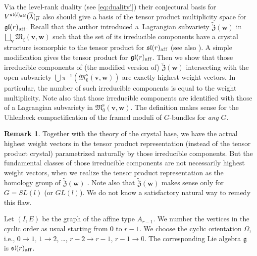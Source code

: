 \documentclass[pdftex]{sigma}
\theoremstyle{definition}
\newtheorem{Remark}[equation]{Remark}
\numberwithin{equation}{section}
\newcommand{\algsl}{\operatorname{\mathfrak{sl}}} %
\newcommand{\gl}{\operatorname{\mathfrak{gl}}}
\newcommand{\g}{{\mathfrak g}}
\newcommand{\M}{{\mathfrak M}} %
\newcommand{\Mreg}{\M^{\operatorname{s}}}
\newcommand{\bv}{{\mathbf v}} %
\newcommand{\bw}{{\mathbf w}} %
\newcommand{\aff}{\mathrm{af\/f}}
\begin{document}
Via the level-rank duality (see \eqref{eq:duality'}) their conjectural
basis for $V^{\algsl(l)_\aff}(\overline{\lambda})_{\overline{\mu}}$
also should give a basis of the tensor product multiplicity space for
$\gl(r)_\aff$.
%
Recall that the author introduced a~Lagrangian subvariety
$\widetilde{\mathfrak Z}(\bw)$ in $\bigsqcup_{\bv} \M_\zeta(\bv,\bw)$
such that the set of its irreducible components have a crystal
structure isomorphic to the tensor product for $\algsl(r)_\aff$
\cite{Na-tensor} (see also \cite{Malkin}).
%
A simple modif\/ication gives the tensor product for $\gl(r)_\aff$. Then
we show that those irreducible components of (the modif\/ied version of)
$\widetilde{\mathfrak Z}(\bw)$ intersecting with the open subvariety
$\bigcup \pi^{-1}(\Mreg_0(\bv,\bw))$ are exactly highest weight
vectors. In particular, the number of such irreducible components is
equal to the weight multiplicity. Note also that those irreducible
components are identif\/ied with those of a Lagrangian subvariety in
$\Mreg_0(\bv,\bw)$. The def\/inition makes sense for the Uhlenbeck
compactif\/ication of the framed moduli of $G$-bundles for {\it any\/}
$G$.

\begin{Remark}
  Together with the theory of the crystal base, we have the actual
  highest weight vectors in the tensor product representation (instead
  of the tensor product crystal) parametrized naturally by those
  irreducible components. But the fundamental classes of those
  irreducible components are not necessarily highest weight vectors,
  when we realize the tensor product representation as the homology
  group of $\widetilde{\mathfrak Z}(\bw)$ \cite{Na-tensor}. Note also
  that $\widetilde{\mathfrak Z}(\bw)$ makes sense only for $G = SL(l)$
  (or $GL(l)$). We do not know a satisfactory natural way to remedy
  this f\/law.
\end{Remark}

Let $(I,E)$ be the graph of the af\/f\/ine type $A_{r-1}$. We number the
vertices in the cyclic order as usual starting from $0$ to $r-1$. We
choose the cyclic orientation $\Omega$, i.e., $0\to 1$, $1\to 2$,
\dots, $r-2\to r-1$, $r-1 \to 0$. The corresponding Lie algebra $\g$
is $\algsl(r)_\aff$.
\end{document}
